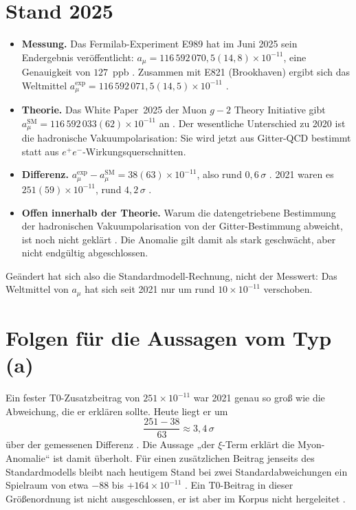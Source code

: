\section{Stand 2025}
\begin{itemize}
\item \textbf{Messung.} Das Fermilab-Experiment E989 hat im Juni 2025 sein
  Endergebnis veröffentlicht: $a_\mu=116\,592\,070{,}5(14{,}8)\times10^{-11}$,
  eine Genauigkeit von $127$~ppb \cite{FNAL2025}. Zusammen mit E821 (Brookhaven)
  ergibt sich das Weltmittel $a_\mu^{\mathrm{exp}}=116\,592\,071{,}5(14{,}5)\times10^{-11}$
  \cite{WP25}.
\item \textbf{Theorie.} Das White Paper~2025 der Muon $g-2$ Theory Initiative gibt
  $a_\mu^{\mathrm{SM}}=116\,592\,033(62)\times10^{-11}$ an \cite{WP25}. Der
  wesentliche Unterschied zu 2020 ist die hadronische Vakuumpolarisation: Sie wird
  jetzt aus Gitter-QCD bestimmt statt aus $e^+e^-$-Wirkungsquerschnitten.
\item \textbf{Differenz.} $a_\mu^{\mathrm{exp}}-a_\mu^{\mathrm{SM}}=38(63)\times10^{-11}$,
  also rund $0{,}6\,\sigma$ \KM. 2021 waren es $251(59)\times10^{-11}$, rund
  $4{,}2\,\sigma$ \KM.
\item \textbf{Offen innerhalb der Theorie.} Warum die datengetriebene Bestimmung der
  hadronischen Vakuumpolarisation von der Gitter-Bestimmung abweicht, ist noch nicht
  geklärt \cite{CERNCourier2025}. Die Anomalie gilt damit als stark geschwächt, aber
  nicht endgültig abgeschlossen.
\end{itemize}
Geändert hat sich also die Standardmodell-Rechnung, nicht der Messwert: Das Weltmittel
von $a_\mu$ hat sich seit 2021 nur um rund $10\times10^{-11}$ verschoben.

\section{Folgen für die Aussagen vom Typ (a)}
Ein fester T0-Zusatzbeitrag von $251\times10^{-11}$ war 2021 genau so groß wie die
Abweichung, die er erklären sollte. Heute liegt er um
\[
  \frac{251-38}{63}\approx3{,}4\,\sigma
\]
über der gemessenen Differenz \KM. Die Aussage „der $\xi$-Term erklärt die
Myon-Anomalie`` ist damit überholt. Für einen zusätzlichen Beitrag jenseits des
Standardmodells bleibt nach heutigem Stand bei zwei Standardabweichungen ein
Spielraum von etwa $-88$ bis $+164\times10^{-11}$ \KM. Ein T0-Beitrag in dieser
Größenordnung ist nicht ausgeschlossen, er ist aber im Korpus nicht hergeleitet
\SM.

